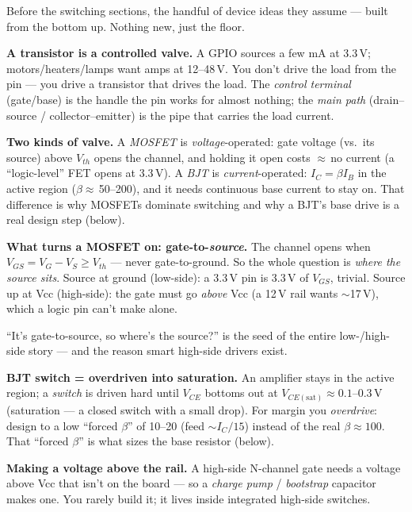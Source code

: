 \documentclass[11pt,a4paper]{article}
\begin{document}
Before the switching sections, the handful of device ideas they assume ---
built from the bottom up. Nothing new, just the floor.

\textbf{A transistor is a controlled valve.} A GPIO sources a few mA at
3.3\,V; motors/heaters/lamps want amps at 12--48\,V. You don't drive the
load from the pin --- you drive a transistor that drives the load. The
\emph{control terminal} (gate/base) is the handle the pin works for almost
nothing; the \emph{main path} (drain--source / collector--emitter) is the
pipe that carries the load current.

\textbf{Two kinds of valve.} A \emph{MOSFET} is \emph{voltage}-operated:
gate voltage (vs.\ its source) above $V_{th}$ opens the channel, and holding
it open costs $\approx$\,no current (a ``logic-level'' FET opens at 3.3\,V).
A \emph{BJT} is \emph{current}-operated: $I_C=\beta I_B$ in the active region
($\beta\approx$\,50--200), and it needs continuous base current to stay on.
That difference is why MOSFETs dominate switching and why a BJT's base drive
is a real design step (below).

\textbf{What turns a MOSFET on: gate-to-\emph{source}.} The channel opens
when $V_{GS}=V_G-V_S\ge V_{th}$ --- never gate-to-ground. So the whole
question is \emph{where the source sits}. Source at ground (low-side): a
3.3\,V pin is 3.3\,V of $V_{GS}$, trivial. Source up at Vcc (high-side): the
gate must go \emph{above} Vcc (a 12\,V rail wants $\sim$17\,V), which a logic
pin can't make alone.

\begin{note}
``It's gate-to-source, so where's the source?'' is the seed of the entire
low-/high-side story --- and the reason smart high-side drivers exist.
\end{note}

\textbf{BJT switch = overdriven into saturation.} An amplifier stays in the
active region; a \emph{switch} is driven hard until $V_{CE}$ bottoms out at
$V_{CE(\text{sat})}\approx0.1$--0.3\,V (saturation --- a closed switch with a
small drop). For margin you \emph{overdrive}: design to a low ``forced
$\beta$'' of 10--20 (feed $\sim I_C/15$) instead of the real
$\beta\approx100$. That ``forced $\beta$'' is what sizes the base resistor
(below).

\textbf{Making a voltage above the rail.} A high-side N-channel gate needs a
voltage above Vcc that isn't on the board --- so a \emph{charge pump} /
\emph{bootstrap} capacitor makes one. You rarely build it; it lives inside
integrated high-side switches.
\end{document}
